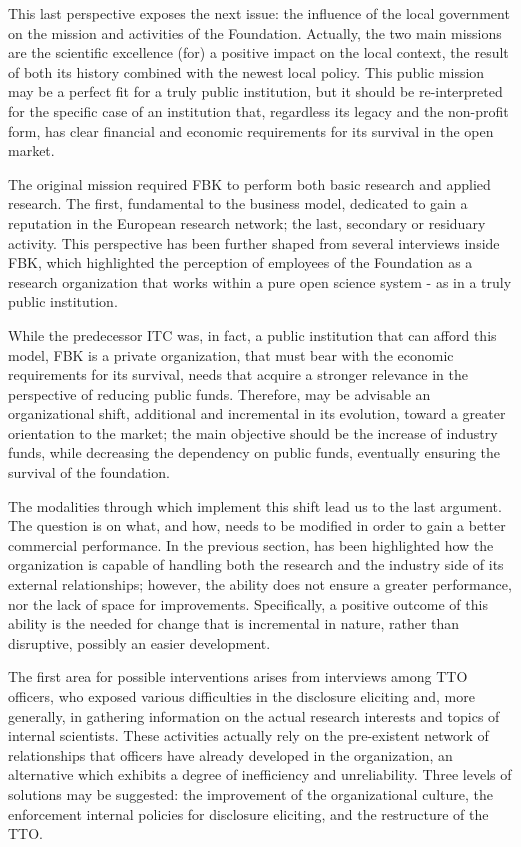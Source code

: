 This last perspective exposes the next issue: the influence of the local government on the mission and activities of the Foundation. Actually, the two main missions are the scientific excellence (for) a positive impact on the local context, the result of both its history combined with the newest local policy. This public mission may be a perfect fit for a truly public institution, but it should be re-interpreted for the specific case of an institution that, regardless its legacy and the non-profit form, has clear financial and economic requirements for its survival in the open market. 

The original mission required FBK to perform both basic research and applied research. The first, fundamental to the business model, dedicated to gain a reputation in the European research network; the last, secondary or residuary activity. This perspective has been further shaped from several interviews inside FBK, which highlighted the perception of employees of the Foundation as a research organization that works within a pure open science system - as in a truly public institution. 

While the predecessor ITC was, in fact, a public institution that can afford this model, FBK is a private organization, that must bear with the economic requirements for its survival, needs that acquire a stronger relevance in the perspective of reducing public funds. Therefore, may be advisable an organizational shift, additional and incremental in its evolution, toward a greater orientation to the market; the main objective should be the increase of industry funds, while decreasing the dependency on public funds, eventually ensuring the survival of the foundation.

The modalities through which implement this shift lead us to the last argument. The question is on what, and how, needs to be modified in order to gain a better commercial performance. In the previous section, has been highlighted how the organization is capable of handling both the research and the industry side of its external relationships; however, the ability does not ensure a greater performance, nor the lack of space for improvements. Specifically, a positive outcome of this ability is the needed for change that is incremental in nature, rather than disruptive, possibly an easier development.

The first area for possible interventions arises from interviews among TTO officers, who exposed various difficulties in the disclosure eliciting and, more generally, in gathering information on the actual research interests and topics of internal scientists. These activities actually rely on the pre-existent network of relationships that officers have already developed in the organization, an alternative which exhibits a degree of inefficiency and unreliability. Three levels of solutions may be suggested: the improvement of the organizational culture, the enforcement internal policies for disclosure eliciting, and the restructure of the TTO.

